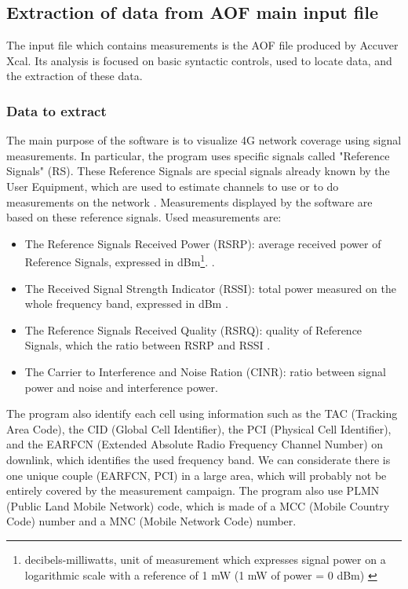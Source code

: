\documentclass[a4paper, 11pt]{report}
\begin{document}
    \subsection{Extraction of data from AOF main input file}
    The input file which contains measurements is the AOF file produced by Accuver Xcal. Its analysis is focused on basic syntactic controls, used to locate data, and the extraction of these data. 
    
    \subsubsection{Data to extract}
    The main purpose of the software is to visualize 4G network coverage using signal measurements. In particular, the program uses specific signals called "Reference Signals" (RS).
    These Reference Signals are special signals already known by the User Equipment, which are used to estimate channels to use or to do measurements on the network \cite{bouguen_lte_2012}.
    Measurements displayed by the software are based on these reference signals. Used measurements are:
    
    \begin{itemize}
        \item The Reference Signals Received Power (RSRP): average received power of Reference Signals, expressed in dBm\footnote{decibels-milliwatts, unit of measurement which expresses signal power on a logarithmic scale with a reference of 1 mW (1 mW of power = 0 dBm) \cite{lagrange_xavier_nodate}}. \cite{bouguen_lte_2012, launay_rsrp_2013}.
        
        \item The Received Signal Strength Indicator (RSSI): total power measured on the whole frequency band, expressed in dBm \cite{launay_rsrp_2013}.
        
        \item The Reference Signals Received Quality (RSRQ): quality of Reference Signals, which the ratio between RSRP and RSSI \cite{bouguen_lte_2012, launay_rsrp_2013}.
        
        \item The Carrier to Interference and Noise Ration (CINR): ratio between signal power and noise and interference power.
        
    \end{itemize}
    
    The program also identify each cell using information such as the TAC (Tracking Area Code), the CID (Global Cell Identifier), the PCI (Physical Cell Identifier), and the EARFCN (Extended Absolute Radio Frequency Channel Number) on downlink, which identifies the used frequency band. We can considerate there is one unique couple (EARFCN, PCI) in a large area, which will probably not be entirely covered by the measurement campaign. The program also use PLMN (Public Land Mobile Network) code, which is made of a MCC (Mobile Country Code) number and a MNC (Mobile Network Code) number. \newline
    
\end{document}
